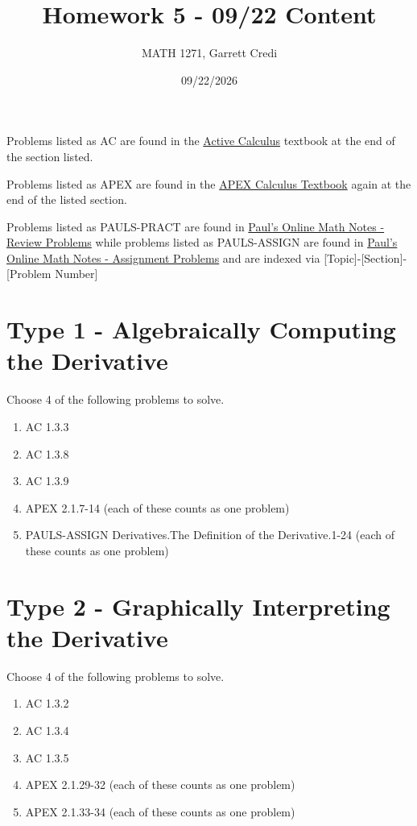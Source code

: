 \documentclass[12pt]{article}
\title{Homework 5 - 09/22 Content}
\author{MATH 1271, Garrett Credi}
\date{09/22/2026}
\begin{document}
\maketitle

Problems listed as AC are found in the \href{https://activecalculus.org/single1e/frontmatter.html}{Active Calculus} 
textbook at the end of the section listed.

Problems listed as APEX are found in the \href{https://opentext.uleth.ca/apex-calculus/apex-calculus.html}{APEX Calculus Textbook}
again at the end of the listed section.

Problems listed as PAULS-PRACT are found in \href{https://tutorial.math.lamar.edu/Problems/CalcI/CalcI.aspx}{Paul's Online Math Notes - Review Problems}
while problems listed as PAULS-ASSIGN are found in \href{https://tutorial.math.lamar.edu/ProblemsNS/CalcI/CalcI.aspx}{Paul's Online Math Notes - Assignment Problems}
and are indexed via [Topic]-[Section]-[Problem Number]

\section{Type 1 - Algebraically Computing the Derivative}
Choose 4 of the following problems to solve.
\begin{enumerate}
  \item AC 1.3.3
  \item AC 1.3.8
  \item AC 1.3.9
  \item APEX 2.1.7-14 (each of these counts as one problem)
  \item PAULS-ASSIGN Derivatives.The Definition of the Derivative.1-24 (each of these counts as one problem)
\end{enumerate}

\section{Type 2 - Graphically Interpreting the Derivative}
Choose 4 of the following problems to solve.

\begin{enumerate}
  \item AC 1.3.2
  \item AC 1.3.4
  \item AC 1.3.5
  \item APEX 2.1.29-32 (each of these counts as one problem)
  \item APEX 2.1.33-34 (each of these counts as one problem)
\end{enumerate}
\end{document}
